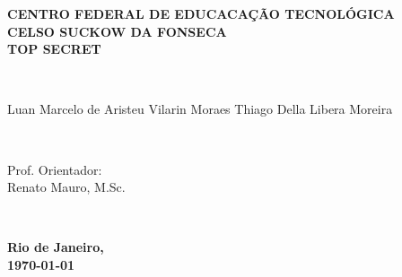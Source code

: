 \documentclass[12pt]{report} %
\begin{document}
	
	\thispagestyle{empty} %
	\center %
	
	\begin{minipage}{\textwidth}
		\begin{center}
			{\bfseries \large CENTRO FEDERAL DE EDUCACAÇÃO TECNOLÓGICA\\ CELSO SUCKOW DA FONSECA}\\[16em]
			{\bfseries \LARGE TOP SECRET}
		\end{center}
	\end{minipage}\\[6em]
	
	\begin{flushright}
		\begin{minipage}{0.5\textwidth}
			\normalsize
			\raggedleft \normalsize Luan Marcelo de Aristeu Vilarin Moraes
			\raggedleft \normalsize Thiago Della Libera Moreira
		\end{minipage}\\[6em]

	\end{flushright}
	
	\begin{flushright}
		\begin{minipage}{0.5\textwidth}
			\raggedleft
			Prof. Orientador:\\
			Renato Mauro, M.Sc.
		\end{minipage}\\
	\end{flushright}
	\vfill	
	{\bfseries \large Rio de Janeiro,\\
		\today} %
	
	\pagebreak
	
	
	\thispagestyle{empty} %
	\center %
	
\end{document}
